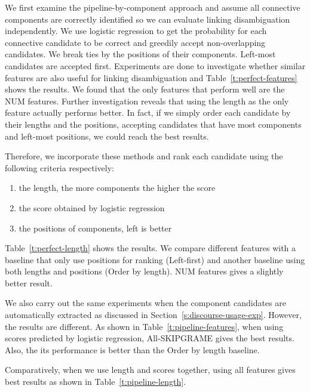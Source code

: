 We first examine the pipeline-by-component approach and assume all connective
components are correctly identified so we can evaluate linking disambiguation
independently. We use logistic regression
to get the probability for each connective candidate to be correct and greedily
accept non-overlapping candidates. We break ties by the positions of their components.
Left-most candidates are accepted first. Experiments are done to investigate whether
similar features are also useful for linking disambiguation and 
Table~\ref{t:perfect-features} shows the results. We found that
the only features that perform well are the NUM features. Further investigation
reveals that using the length as the only feature actually performs better.
In fact, if we simply order each candidate by their lengths and the positions,
accepting candidates that have most components and left-most positions, we could
reach the best results.




Therefore, we incorporate these methods and rank each candidate using the following
criteria respectively:

\begin{enumerate}
    \item the length, the more components the higher the score
    \item the score obtained by logistic regression
    \item the positions of components, left is better
\end{enumerate}

Table~\ref{t:perfect-length} shows the results. We compare different features
with a baseline that only use positions for ranking (Left-first) and another
baseline using both lengths and positions (Order by length). NUM features gives
a slightly better result.



We also carry out the same experiments when the component candidates are automatically
extracted as discussed in Section~\ref{s:discourse-usage-exp}. However, the results
are different. As shown in Table~\ref{t:pipeline-features}, when using scores
predicted by logistic regression, All-SKIPGRAME gives the best results. Also,
the its performance is better than the Order by length baseline.



Comparatively, when we use length and scores together, using all features gives
best results as shown in Table~\ref{t:pipeline-length}.


